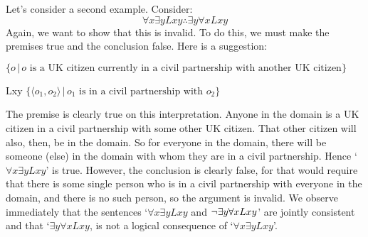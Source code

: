 Let's consider a second example. Consider:
	$$\forall x \exists y Lxy \therefore \exists y \forall x Lxy$$
Again, we want to show that this is invalid. To do this, we must make the premises true and the conclusion false. Here is a suggestion:
	\begin{ekey}
		\item[\text{domain}] $\{o\,|\,o\text{ is a UK citizen currently in a civil partnership with another UK citizen}\}$
		\item[Lxy] $\{\langle o_1,o_2\rangle\,|\, o_1\text{ is in a civil partnership with }o_2\}$
	\end{ekey}
The premise is clearly true on this interpretation. Anyone in the domain is a UK citizen in a civil partnership with some other UK citizen. That other citizen will also, then, be in the domain. So for everyone in the domain, there will be someone (else) in the domain with whom they are in a civil partnership. Hence `$\forall x \exists y Lxy$' is true. However, the conclusion is clearly false, for that would require that there is some single person who is in a civil partnership with everyone in the domain, and there is no such person, so the argument is invalid. We observe immediately that the sentences `$\forall x \exists y Lxy$ and $\neg\exists y \forall x Lxy$' are jointly consistent and that `$\exists y \forall x Lxy$, is not a logical consequence of `$\forall x \exists y Lxy$'.


